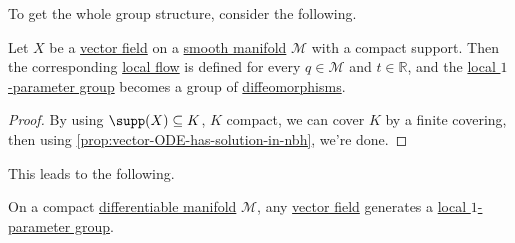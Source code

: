 To get the whole group structure, consider the following.

\begin{theorem}
	Let \(X\) be a \hyperref[def:vector-field]{vector field} on a \hyperref[def:smooth-manifold]{smooth manifold} \(\mathcal{M} \) with a compact support. Then the corresponding \hyperref[def:local-flow]{local flow} is defined for every \(q\in \mathcal{M} \) and \(t\in \mathbb{R} \), and the \hyperref[def:local-1-parameter-group]{local \(1\)-parameter group} becomes a group of \hyperref[def:diffeomorphism]{diffeomorphisms}.
\end{theorem}
\begin{proof}
	By using \(\supp(X) \subseteq K\), \(K\) compact, we can cover \(K\) by a finite covering, then using \autoref{prop:vector-ODE-has-solution-in-nbh}, we're done.
\end{proof}

This leads to the following.

\begin{corollary}
	On a compact \hyperref[def:smooth-manifold]{differentiable manifold} \(\mathcal{M} \), any \hyperref[def:vector-field]{vector field} generates a \hyperref[def:local-1-parameter-group]{local \(1\)-parameter group}.
\end{corollary}